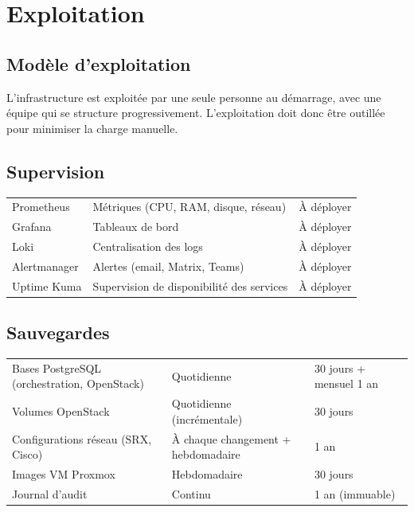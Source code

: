 \chapter{Exploitation}
\label{chap:exploitation}

\section{Modèle d'exploitation}
L'infrastructure est exploitée par une seule personne au démarrage, avec une équipe qui se structure progressivement. L'exploitation doit donc être outillée pour minimiser la charge manuelle.

\section{Supervision}
\begin{xltabular}{\textwidth}{@{}lXl@{}}
\toprule
{} &  &  \\
\midrule
\endhead
\bottomrule
\endfoot
\bottomrule
\endlastfoot
Prometheus & Métriques (CPU, RAM, disque, réseau) & À déployer \\
Grafana    & Tableaux de bord & À déployer \\
Loki       & Centralisation des logs & À déployer \\
Alertmanager & Alertes (email, Matrix, Teams) & À déployer \\
Uptime Kuma & Supervision de disponibilité des services & À déployer \\

\end{xltabular}

\section{Sauvegardes}
\begin{xltabular}{\textwidth}{@{}lXX@{}}
\toprule
{} &  &  \\
\midrule
\endhead
\bottomrule
\endfoot
\bottomrule
\endlastfoot
Bases PostgreSQL (orchestration, OpenStack) & Quotidienne & 30 jours + mensuel 1 an \\
Volumes OpenStack & Quotidienne (incrémentale) & 30 jours \\
Configurations réseau (SRX, Cisco) & À chaque changement + hebdomadaire & 1 an \\
Images VM Proxmox & Hebdomadaire & 30 jours \\
Journal d'audit & Continu & 1 an (immuable) \\

\end{xltabular}


